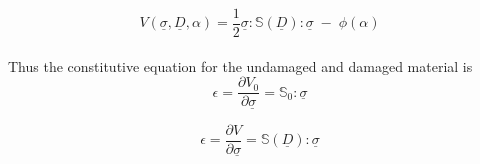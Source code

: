 \documentclass[12pt,a4paper,twoside,openright]{report}
\begin{document}
\begin{equation}
V(\underline{\sigma},\underline{D},\alpha) = \frac{1}{2}\underline{\sigma}: \mathbb{S}(\underline{D}) : \underline{\sigma} \; - \; \phi(\alpha)
\end{equation}
\\
Thus the constitutive equation for the undamaged and damaged material is 
\\
\begin{equation}
\epsilon = \frac{\partial V_{0} }{\partial \underline{\sigma}} = \mathbb{S}_{0} : \underline{\sigma}
\end{equation}

\begin{equation}
\epsilon = \frac{\partial V }{\partial \underline{\sigma}} = \mathbb{S}(\underline{D}) : \underline{\sigma}
\label{eqn:Strain_energy_eq}
\end{equation}
\end{document}
